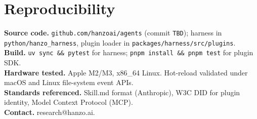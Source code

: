 \documentclass[11pt]{article}
\begin{document}
















\section*{Reproducibility}
\textbf{Source code.} \texttt{github.com/hanzoai/agents} (commit \texttt{TBD}); harness in \texttt{python/hanzo\_harness}, plugin loader in \texttt{packages/harness/src/plugins}.\\
\textbf{Build.} \texttt{uv sync \&\& pytest} for harness; \texttt{pnpm install \&\& pnpm test} for plugin SDK.\\
\textbf{Hardware tested.} Apple M2/M3, x86\_64 Linux. Hot-reload validated under macOS and Linux file-system event APIs.\\
\textbf{Standards referenced.} Skill.md format (Anthropic), W3C DID for plugin identity, Model Context Protocol (MCP).\\
\textbf{Contact.} research@hanzo.ai.
\end{document}
